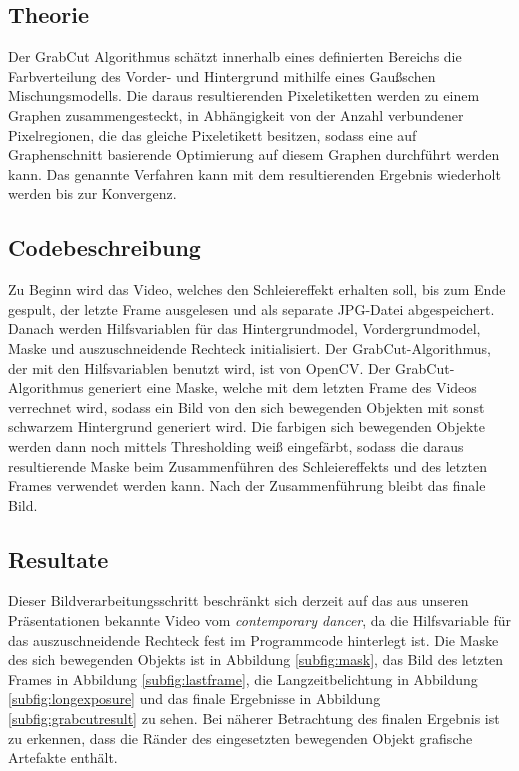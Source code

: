 \documentclass[12pt]{scrartcl}
\begin{document}
\subsection{Theorie}
Der GrabCut Algorithmus sch\"atzt innerhalb eines definierten Bereichs die Farbverteilung des Vorder- und Hintergrund mithilfe eines Gau{\ss}schen Mischungsmodells. Die daraus resultierenden Pixeletiketten werden zu einem Graphen zusammengesteckt, in Abh\"angigkeit von der Anzahl verbundener Pixelregionen, die das gleiche Pixeletikett besitzen, sodass eine auf Graphenschnitt basierende Optimierung auf diesem Graphen durchf\"uhrt werden kann. Das genannte Verfahren kann mit dem resultierenden Ergebnis wiederholt werden bis zur Konvergenz. %
\subsection{Codebeschreibung}
Zu Beginn wird das Video, welches den Schleiereffekt erhalten soll, bis zum Ende gespult, der letzte Frame ausgelesen und als separate JPG-Datei abgespeichert. Danach werden Hilfsvariablen f\"ur das Hintergrundmodel, Vordergrundmodel, Maske und auszuschneidende Rechteck initialisiert. Der GrabCut-Algorithmus, der mit den Hilfsvariablen benutzt wird, ist von OpenCV. Der GrabCut-Algorithmus generiert eine Maske, welche mit dem letzten Frame des Videos verrechnet wird, sodass ein Bild von den sich bewegenden Objekten mit sonst schwarzem Hintergrund generiert wird. Die farbigen sich bewegenden Objekte werden dann noch mittels Thresholding wei{\ss} eingef\"arbt, sodass die daraus resultierende Maske beim Zusammenf\"uhren des Schleiereffekts und des letzten Frames verwendet werden kann. Nach der Zusammenf\"uhrung bleibt das finale Bild.
\subsection{Resultate}
Dieser Bildverarbeitungsschritt beschr\"ankt sich derzeit auf das aus unseren Pr\"asentationen bekannte Video vom \textit{contemporary dancer}, da die Hilfsvariable f\"ur das auszuschneidende Rechteck fest im Programmcode hinterlegt ist. Die Maske des sich bewegenden Objekts ist in Abbildung \ref{subfig:mask}, das Bild des letzten Frames in Abbildung \ref{subfig:lastframe}, die Langzeitbelichtung in Abbildung \ref{subfig:longexposure} und das finale Ergebnisse in Abbildung \ref{subfig:grabcutresult} zu sehen. Bei n\"aherer Betrachtung des finalen Ergebnis ist zu erkennen, dass die R\"ander des eingesetzten bewegenden Objekt grafische Artefakte enth\"alt.
\end{document}
